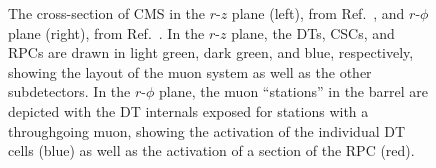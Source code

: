 \begin{figure}[htb]
    \centering
    \quad
    \caption[The cross-section of CMS in the $r$-$z$ and $r$-$\phi$ planes, respectively.]{
        The cross-section of CMS in the $r$-$z$ plane (left), from Ref.~\cite{CMS:2018rym}, and $r$-$\phi$ plane (right), from Ref.~\cite{CMSWebMuons}. 
        In the $r$-$z$ plane, the DTs, CSCs, and RPCs are drawn in light green, dark green, and blue, respectively, showing the layout of the muon system as well as the other subdetectors. 
        In the $r$-$\phi$ plane, the muon ``stations'' in the barrel are depicted with the DT internals exposed for stations with a throughgoing muon, showing the activation of the individual DT cells (blue) as well as the activation of a section of the RPC (red).
    }
\end{figure}

